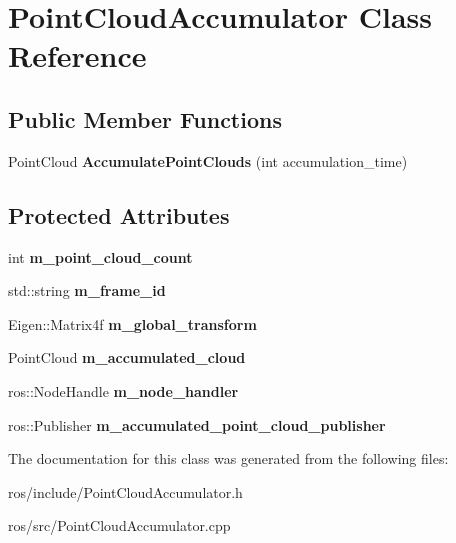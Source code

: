 \hypertarget{class_point_cloud_accumulator}{\section{\-Point\-Cloud\-Accumulator \-Class \-Reference}
\label{class_point_cloud_accumulator}
}
\subsection*{\-Public \-Member \-Functions}
\begin{DoxyCompactItemize}
\item 
\hypertarget{class_point_cloud_accumulator_a24d93cde9ce3cce292779934f2b97ede}{\-Point\-Cloud {\bfseries \-Accumulate\-Point\-Clouds} (int accumulation\-\_\-time)}\label{class_point_cloud_accumulator_a24d93cde9ce3cce292779934f2b97ede}

\end{DoxyCompactItemize}
\subsection*{\-Protected \-Attributes}
\begin{DoxyCompactItemize}
\item 
\hypertarget{class_point_cloud_accumulator_a6ebb0ca53506f1ae2d0f6e411e2dff66}{int {\bfseries m\-\_\-point\-\_\-cloud\-\_\-count}}\label{class_point_cloud_accumulator_a6ebb0ca53506f1ae2d0f6e411e2dff66}

\item 
\hypertarget{class_point_cloud_accumulator_af8ef35b00c6d547b8d3fa89ad8a8b49a}{std\-::string {\bfseries m\-\_\-frame\-\_\-id}}\label{class_point_cloud_accumulator_af8ef35b00c6d547b8d3fa89ad8a8b49a}

\item 
\hypertarget{class_point_cloud_accumulator_a7ea0dd4449475e6939cefbdb0fd260c5}{\-Eigen\-::\-Matrix4f {\bfseries m\-\_\-global\-\_\-transform}}\label{class_point_cloud_accumulator_a7ea0dd4449475e6939cefbdb0fd260c5}

\item 
\hypertarget{class_point_cloud_accumulator_a0db3c1a8e6de37bcb25c260626d63ff0}{\-Point\-Cloud {\bfseries m\-\_\-accumulated\-\_\-cloud}}\label{class_point_cloud_accumulator_a0db3c1a8e6de37bcb25c260626d63ff0}

\item 
\hypertarget{class_point_cloud_accumulator_ac9070e4cb82ddf04bb50cc2492e597ae}{ros\-::\-Node\-Handle {\bfseries m\-\_\-node\-\_\-handler}}\label{class_point_cloud_accumulator_ac9070e4cb82ddf04bb50cc2492e597ae}

\item 
\hypertarget{class_point_cloud_accumulator_a117cbef73e39daeda50c32212a3cc603}{ros\-::\-Publisher {\bfseries m\-\_\-accumulated\-\_\-point\-\_\-cloud\-\_\-publisher}}\label{class_point_cloud_accumulator_a117cbef73e39daeda50c32212a3cc603}

\end{DoxyCompactItemize}


\-The documentation for this class was generated from the following files\-:\begin{DoxyCompactItemize}
\item 
ros/include/\-Point\-Cloud\-Accumulator.\-h\item 
ros/src/\-Point\-Cloud\-Accumulator.\-cpp\end{DoxyCompactItemize}
